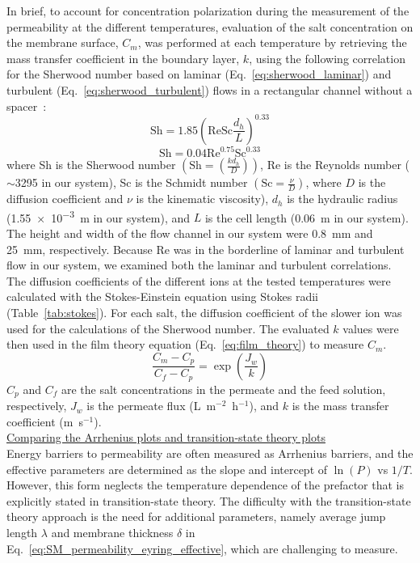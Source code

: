 In brief, to account for concentration polarization during the measurement of the permeability at the different temperatures, evaluation of the salt concentration on the membrane surface, $C_m$, was performed at each temperature by retrieving the mass transfer coefficient in the boundary layer, $k$, using the following correlation for the Sherwood number based on laminar (Eq.~\ref{eq:sherwood_laminar}) and turbulent (Eq.~\ref{eq:sherwood_turbulent}) flows in a rectangular channel without a spacer~\cite{mulder_basic_1996}: 
\begin{equation}
    \text{Sh} = 1.85 \left( \text{Re} \text{Sc} \frac{d_h}{L} \right)^{0.33}
    \label{eq:sherwood_laminar}
\end{equation}
\begin{equation}
    \text{Sh} = 0.04 \text{Re}^{0.75} \text{Sc}^{0.33}
    \label{eq:sherwood_turbulent}
\end{equation}
where Sh is the Sherwood number $\left( \text{Sh}=\left( \frac{k d_h}{D} \right) \right)$, Re is the Reynolds number ($\sim$3295 in our system), Sc is the Schmidt number $\left( \text{Sc} = \frac{\nu}{D} \right)$, where $D$ is the diffusion coefficient and $\nu$ is the kinematic viscosity), $d_h$ is the hydraulic radius (\num{1.55e-3}~m in our system), and $L$ is the cell length (0.06~m in our system). The height and width of the flow channel in our system were 0.8~mm and 25~mm, respectively. Because Re was in the borderline of laminar and turbulent flow in our system, we examined both the laminar and turbulent correlations. The diffusion coefficients of the different ions at the tested temperatures were calculated with the Stokes-Einstein equation using Stokes radii (Table~\ref{tab:stokes}). For each salt, the diffusion coefficient of the slower ion was used for the calculations of the Sherwood number. The evaluated $k$ values were then used in the film theory equation (Eq.~\ref{eq:film_theory}) to measure $C_m$.
\begin{equation}
    \frac{C_m - C_p}{C_f - C_p} = \exp{\left( \frac{J_w}{k} \right)}
    \label{eq:film_theory}
\end{equation}
$C_p$ and $C_f$ are the salt concentrations in the permeate and the feed solution, respectively, $J_w$ is the permeate flux (L~m$^{-2}$~h$^{-1}$), and $k$ is the mass transfer coefficient (m~s$^{-1}$). \\

\noindent \underline{Comparing the Arrhenius plots and transition-state theory plots} \\
Energy barriers to permeability are often measured as Arrhenius barriers, and the effective parameters are determined as the slope and intercept of $\ln(P)$ vs $1/T$. However, this form neglects the temperature dependence of the prefactor that is explicitly stated in transition-state theory. The difficulty with the transition-state theory approach is the need for additional parameters, namely average jump length $\lambda$ and membrane thickness $\delta$ in Eq.~\ref{eq:SM_permeability_eyring_effective}, which are challenging to measure. 

